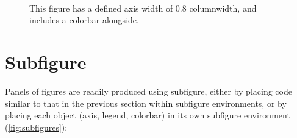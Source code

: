 \documentclass{article}
\begin{document}
\begin{figure}[ht]
    \centering
    \hspace{0.0576\columnwidth}
    \def\svgwidth{0.8\columnwidth}
    
    \def\svgwidth{0.0576\columnwidth}
    \\
    \vspace{3ex}
    \caption{This figure has a defined axis width of 0.8 columnwidth, and includes a colorbar alongside.}
    \label{fig:peakscbar085w}
\end{figure}

\section{Subfigure}
Panels of figures are readily produced using subfigure, either by placing code similar to that in the previous section within subfigure environments, or by placing each object (axis, legend, colorbar) in its own subfigure environment (\ref{fig:subfigures}): 
\end{document}
